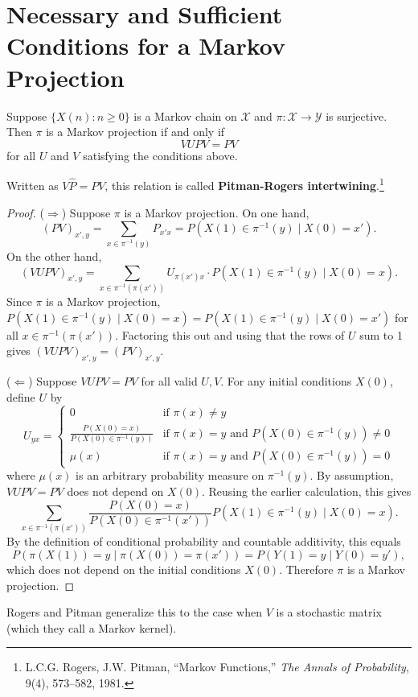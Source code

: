 \documentclass[12pt]{ximera}
\begin{document}
\section*{Necessary and Sufficient Conditions for a Markov Projection}

\begin{theorem}
Suppose $\{X(n) : n \geq 0\}$ is a Markov chain on $\mathcal{X}$ and $\pi : \mathcal{X} \to \mathcal{Y}$ is surjective. Then $\pi$ is a Markov projection if and only if
\[
VUPV = PV
\]
for all $U$ and $V$ satisfying the conditions above.
\end{theorem}

\begin{remark}
Written as $V\hat{P} = PV$, this relation is called \textbf{Pitman-Rogers intertwining}.\footnote{L.C.G. Rogers, J.W. Pitman, ``Markov Functions,'' \textit{The Annals of Probability}, 9(4), 573--582, 1981.}
\end{remark}

\begin{proof}
($\Rightarrow$) Suppose $\pi$ is a Markov projection. On one hand,
\[
(PV)_{x',y} = \sum_{x \in \pi^{-1}(y)} P_{x'x} = P(X(1) \in \pi^{-1}(y) \mid X(0) = x').
\]
On the other hand,
\[
(VUPV)_{x',y} = \sum_{x \in \pi^{-1}(\pi(x'))} U_{\pi(x')x} \cdot P(X(1) \in \pi^{-1}(y) \mid X(0) = x).
\]
Since $\pi$ is a Markov projection, $P(X(1) \in \pi^{-1}(y) \mid X(0) = x) = P(X(1) \in \pi^{-1}(y) \mid X(0) = x')$ for all $x \in \pi^{-1}(\pi(x'))$. Factoring this out and using that the rows of $U$ sum to 1 gives $(VUPV)_{x',y} = (PV)_{x',y}$.

($\Leftarrow$) Suppose $VUPV = PV$ for all valid $U, V$. For any initial conditions $X(0)$, define $U$ by
\[
U_{yx} = \begin{cases} 0 & \text{if } \pi(x) \neq y \\ \frac{P(X(0)=x)}{P(X(0) \in \pi^{-1}(y))} & \text{if } \pi(x) = y \text{ and } P(X(0) \in \pi^{-1}(y)) \neq 0 \\ \mu(x) & \text{if } \pi(x) = y \text{ and } P(X(0) \in \pi^{-1}(y)) = 0 \end{cases}
\]
where $\mu(x)$ is an arbitrary probability measure on $\pi^{-1}(y)$. By assumption, $VUPV = PV$ does not depend on $X(0)$. Reusing the earlier calculation, this gives
\[
\sum_{x \in \pi^{-1}(\pi(x'))} \frac{P(X(0)=x)}{P(X(0) \in \pi^{-1}(x'))} P(X(1) \in \pi^{-1}(y) \mid X(0) = x).
\]
By the definition of conditional probability and countable additivity, this equals
\[
P(\pi(X(1)) = y \mid \pi(X(0)) = \pi(x')) = P(Y(1) = y \mid Y(0) = y'),
\]
which does not depend on the initial conditions $X(0)$. Therefore $\pi$ is a Markov projection.
\end{proof}

\begin{remark}
Rogers and Pitman generalize this to the case when $V$ is a stochastic matrix (which they call a Markov kernel).
\end{remark}
\end{document}
